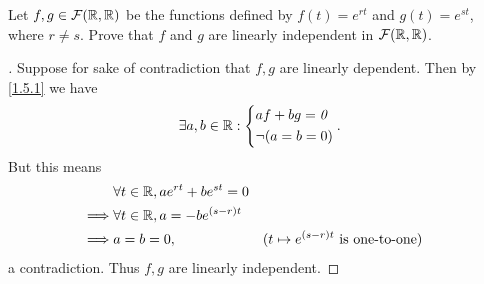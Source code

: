 \begin{ex}\label{ex:1.5.20}
  Let \(f, g \in \fs{\R}{\R}\) be the functions defined by \(f(t) = e^{rt}\) and \(g(t) = e^{st}\), where \(r \neq s\).
  Prove that \(f\) and \(g\) are linearly independent in \(\fs{\R}{\R}\).
\end{ex}

\begin{proof}[]
  Suppose for sake of contradiction that \(f, g\) are linearly dependent.
  Then by \cref{1.5.1} we have
  \[
    \exists a, b \in \mathbb{R} : \begin{dcases}
      af + bg = \mathit{0} \\
      \lnot (a = b = 0)
    \end{dcases}.
  \]
  But this means
  \begin{align*}
             & \forall t \in \mathbb{R}, ae^{rt} + be^{st} = 0                                                         \\
    \implies & \forall t \in \mathbb{R}, a = -b e^{(s - r) t}                                                          \\
    \implies & a = b = 0,                              &  & \text{(\(t \mapsto e^{(s - r) t}\) is one-to-one)}
  \end{align*}
  a contradiction.
  Thus \(f, g\) are linearly independent.
\end{proof}
